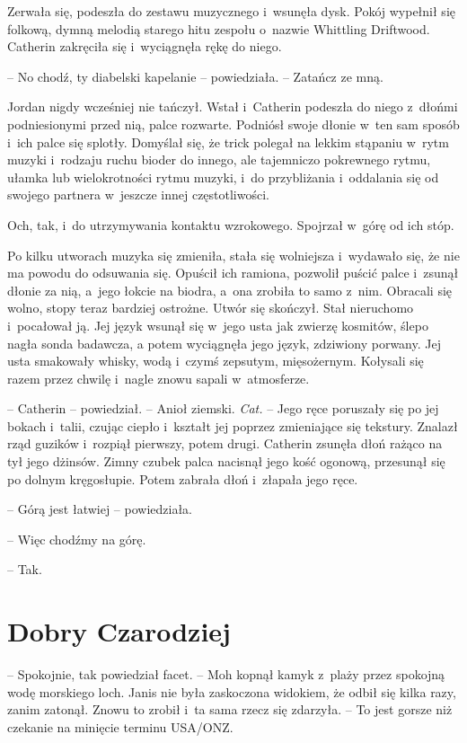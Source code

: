 \documentclass[oneside,polish,11pt,sfheadings]{mwbk}
\begin{document}
Zerwała się, podeszła do zestawu muzycznego i~wsunęła dysk. Pokój
wypełnił się folkową, dymną melodią starego hitu zespołu o~nazwie
Whittling Driftwood. Catherin zakręciła się i~wyciągnęła rękę do niego.

-- No chodź, ty diabelski kapelanie -- powiedziała. -- Zatańcz ze mną.

Jordan nigdy wcześniej nie tańczył. Wstał i~Catherin podeszła do niego z~dłońmi podniesionymi przed nią, palce rozwarte. Podniósł swoje dłonie w~ten sam sposób i~ich palce się splotły. Domyślał się, że trick polegał
na lekkim stąpaniu w~rytm muzyki i~rodzaju ruchu bioder do innego, ale
tajemniczo pokrewnego rytmu, ułamka lub wielokrotności rytmu muzyki, i~do przybliżania i~oddalania się od swojego partnera w~jeszcze innej
częstotliwości.

Och, tak, i~do utrzymywania kontaktu wzrokowego. Spojrzał w~górę od ich
stóp.

Po kilku utworach muzyka się zmieniła, stała się wolniejsza i~wydawało
się, że nie ma powodu do odsuwania się. Opuścił ich ramiona, pozwolił
puścić palce i~zsunął dłonie za nią, a~jego łokcie na biodra, a~ona
zrobiła to samo z~nim. Obracali się wolno, stopy teraz bardziej
ostrożne. Utwór się skończył. Stał nieruchomo i~pocałował ją. Jej język
wsunął się w~jego usta jak zwierzę kosmitów, ślepo nagła sonda badawcza,
a potem wyciągnęła jego język, zdziwiony porwany. Jej usta smakowały
whisky, wodą i~czymś zepsutym, mięsożernym. Kołysali się razem przez
chwilę i~nagle znowu sapali w~atmosferze.

-- Catherin -- powiedział. -- Anioł ziemski. \emph{Cat.} -- Jego ręce
poruszały się po jej bokach i~talii, czując ciepło i~kształt jej poprzez
zmieniające się tekstury. Znalazł rząd guzików i~rozpiął pierwszy, potem
drugi. Catherin zsunęła dłoń rażąco na tył jego dżinsów. Zimny czubek
palca nacisnął jego kość ogonową, przesunął się po dolnym kręgosłupie.
Potem zabrała dłoń i~złapała jego ręce.

-- Górą jest łatwiej -- powiedziała.

-- Więc chodźmy na górę.

-- Tak.

\chapter{Dobry Czarodziej}

-- Spokojnie, tak powiedział facet. -- Moh kopnął kamyk z~plaży przez spokojną
wodę morskiego loch. Janis nie była zaskoczona widokiem, że odbił się
kilka razy, zanim zatonął. Znowu to zrobił i~ta sama rzecz się zdarzyła.
-- To jest gorsze niż czekanie na minięcie terminu USA/ONZ.
\end{document}

